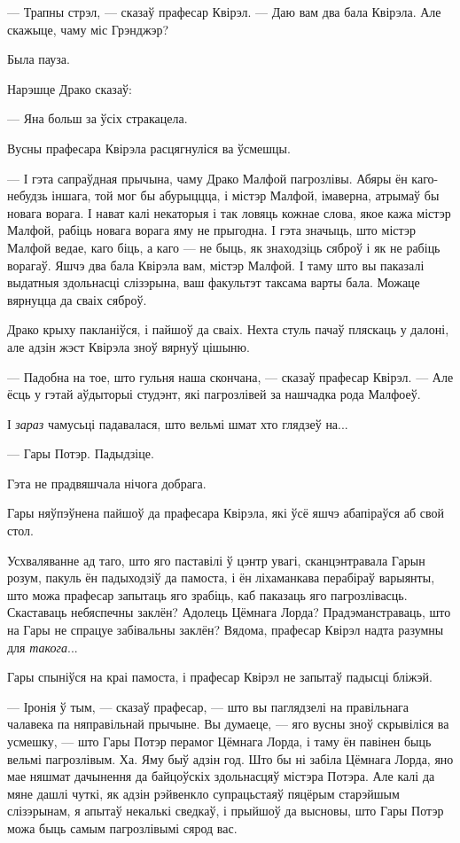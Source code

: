 --- Трапны стрэл, --- сказаў прафесар Квірэл. --- Даю вам два бала Квірэла.
Але скажыце, чаму міс Грэнджэр?

Была пауза.

Нарэшце Драко сказаў:

--- Яна больш за ўсіх стракацела.

Вусны прафесара Квірэла расцягнуліся ва ўсмешцы.

--- І гэта сапраўдная прычына, чаму Драко Малфой пагрозлівы. Абяры ён каго-небудзь
іншага, той мог бы абурыццца, і містэр Малфой, імаверна, атрымаў бы новага ворага.
І нават калі некаторыя і так ловяць кожнае слова, якое кажа містэр Малфой,
рабіць новага ворага яму не прыгодна. І гэта значыць, што містэр Малфой ведае,
каго біць, а каго --- не быць, як знаходзіць сяброў і як не рабіць ворагаў.
Яшчэ два бала Квірэла вам, містэр Малфой. І таму што вы паказалі выдатныя здольнасці 
слізэрына, ваш факультэт таксама варты бала. Можаце вярнуцца да сваіх сяброў.

Драко крыху пакланіўся, і пайшоў да сваіх. Нехта стуль пачаў пляскаць у далоні, але 
адзін жэст Квірэла зноў вярнуў цішыню.

--- Падобна на тое, што гульня наша скончана, --- сказаў прафесар Квірэл. --- Але 
ёсць у гэтай аўдыторыі студэнт, які пагрозлівей за нашчадка рода Малфоеў.

І \emph{зараз} чамусьці падавалася, што вельмі шмат хто глядзеў на...

--- Гары Потэр. Падыдзіце.

Гэта не прадвяшчала нічога добрага.

Гары няўпэўнена пайшоў да прафесара Квірэла, які ўсё яшчэ абапіраўся аб свой стол.

Усхваляванне ад таго, што яго паставілі ў цэнтр увагі, сканцэнтравала Гарын розум,
пакуль ён падыходзіў да памоста, і ён ліхаманкава перабіраў варыянты, што можа 
прафесар запытаць яго зрабіць, каб паказаць яго пагрозлівасць.
Скаставаць небяспечны заклён? Адолець Цёмнага Лорда? Прадэманстраваць, што 
на Гары не спрацуе забівальны заклён? Вядома, прафесар Квірэл надта разумны для 
\emph{такога}...

Гары спыніўся на краі памоста, і прафесар Квірэл не запытаў падысці бліжэй.

--- Іронія ў тым, --- сказаў прафесар, --- што вы паглядзелі на правільнага 
чалавека па няправільнай прычыне. Вы думаеце, --- яго вусны зноў скрывіліся ва 
усмешку, --- што Гары Потэр перамог Цёмнага Лорда, і таму ён павінен быць вельмі
пагрозлівым. Ха. Яму быў адзін год. Што бы ні забіла Цёмнага Лорда, яно мае 
няшмат дачынення да байцоўскіх здольнасцяў містэра Потэра.
Але калі да мяне дашлі чуткі, як адзін рэйвенкло супрацьстаяў пяцёрым старэйшым 
слізэрынам, я апытаў некалькі сведкаў, і прыйшоў да высновы, што Гары Потэр можа
быць самым пагрозлівымі сярод вас.


